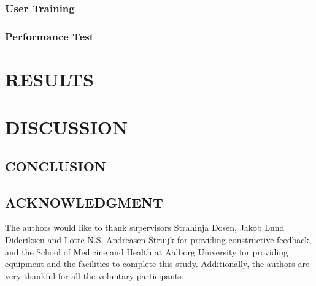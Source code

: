 \begin{multicols}{2}
	\subsubsection*{User Training}
	
	
	\subsubsection*{Performance Test}

	
	
	\end{multicols}
		
	\section*{RESULTS}%
	
	
	
	\section*{DISCUSSION}%
	
	
	
	\subsection*{CONCLUSION}%
	
	
	
	
	
	\subsection*{ACKNOWLEDGMENT}
	
	The authors would like to thank supervisors Strahinja Dosen, Jakob Lund Dideriksen and Lotte N.S. Andreasen Struijk for providing constructive feedback, and the School of Medicine and Health at Aalborg University for providing equipment and the facilities to complete this study. Additionally, the authors are very thankful for all the voluntary participants. 


